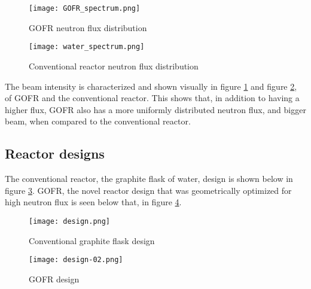\begin{figure}[!htbp]
\caption{GOFR neutron flux distribution}
\label{fig:GOFR-spec}
\centering
\texttt{[image: GOFR\_spectrum.png]}
\end{figure}

\begin{figure}[!htbp]
\caption{Conventional reactor neutron flux distribution}
\label{fig:water-spec}
\centering
\texttt{[image: water\_spectrum.png]}
\end{figure}

The beam intensity is characterized and shown visually in figure \ref{fig:GOFR-spec} and figure \ref{fig:water-spec}, of GOFR and the conventional reactor. This shows that, in addition to having a higher flux, GOFR also has a more uniformly distributed neutron flux, and bigger beam, when compared to the conventional reactor.

\subsection{Reactor designs}
The conventional reactor, the graphite flask of water, design is shown below in figure \ref{fig:design1}. GOFR, the novel reactor design that was geometrically optimized for high neutron flux is seen below that, in figure \ref{fig:design2}.

\begin{figure}[!htbp]
\caption{Conventional graphite flask design}
\label{fig:design1}
\centering
\texttt{[image: design.png]}
\end{figure}

\begin{figure}[!htbp]
\caption{GOFR design}
\label{fig:design2}
\centering
\texttt{[image: design-02.png]}
\end{figure}
